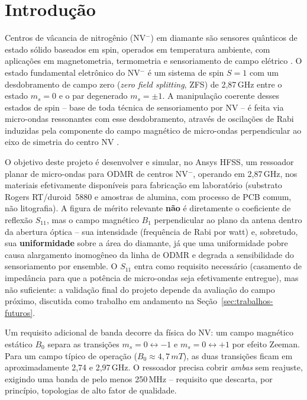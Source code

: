 \documentclass[10pt,a4paper,twocolumn]{article}
\begin{document}
\section{Introdu\c{c}\~ao}
\label{sec:introducao}

Centros de v\^acancia de nitrog\^enio (NV$^-$) em diamante s\~ao
sensores qu\^anticos de estado s\'olido baseados em spin, operados em
temperatura ambiente, com aplica\c{c}\~oes em magnetometria,
termometria e sensoriamento de campo el\'etrico
\cite{doherty2013,barry2020}. O estado fundamental eletr\^onico do
NV$^-$ \'e um sistema de spin $S=1$ com um desdobramento de campo zero
(\emph{zero field splitting}, ZFS) de 2,87\,GHz entre o
estado $m_s=0$ e o par degenerado $m_s=\pm1$. A manipula\c{c}\~ao
coerente desses estados de spin -- base de toda t\'ecnica de
sensoriamento por NV -- \'e feita via micro-ondas ressonantes com esse
desdobramento, atrav\'es de oscila\c{c}\~oes de Rabi induzidas pela
componente do campo magn\'etico de micro-ondas perpendicular ao eixo de
simetria do centro NV \cite{abesasaki2018}.

O objetivo deste projeto \'e desenvolver e simular, no Ansys HFSS, um
ressoador planar de micro-ondas para ODMR de centros NV$^-$,
operando em 2,87\,GHz, nos materiais efetivamente
dispon\'iveis para fabrica\c{c}\~ao em laborat\'orio (substrato Rogers
RT/duroid~5880 e amostras de alumina, com processo de PCB comum, n\~ao
litografia). A figura de m\'erito relevante \textbf{n\~ao} \'e
diretamente o coeficiente de reflex\~ao $S_{11}$, mas o campo magn\'etico
$B_1$ perpendicular ao plano da antena dentro da abertura \'optica --
sua intensidade (frequ\^encia de Rabi por watt) e, sobretudo, sua
\textbf{uniformidade} sobre a \'area do diamante, j\'a que uma
uniformidade pobre causa alargamento inomog\^eneo da linha de ODMR e
degrada a sensibilidade do sensoriamento por ensemble. O $S_{11}$
entra como requisito necess\'ario (casamento de imped\^ancia para que
a pot\^encia de micro-ondas seja efetivamente entregue), mas n\~ao
suficiente: a valida\c{c}\~ao final do projeto depende da avalia\c{c}\~ao
do campo pr\'oximo, discutida como trabalho em andamento na
Se\c{c}\~ao~\ref{sec:trabalhos-futuros}.

Um requisito adicional de banda decorre da f\'isica do NV: um campo
magn\'etico est\'atico $B_0$ separa as transi\c{c}\~oes
$m_s=0\leftrightarrow-1$ e $m_s=0\leftrightarrow+1$ por efeito Zeeman.
Para um campo t\'ipico de opera\c{c}\~ao ($B_0\approx4,7\,mT$), as
duas transi\c{c}\~oes ficam em aproximadamente 2,74 e
2,97\,GHz. O ressoador precisa cobrir \emph{ambas} sem
reajuste, exigindo uma banda de pelo menos 250\,MHz --
requisito que descarta, por princ\'ipio, topologias de alto fator de
qualidade.
\end{document}
